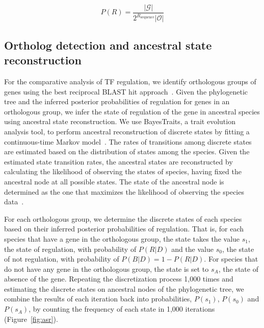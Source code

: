 \begin{equation}
P(R) = \frac{|\mathcal{G}|}{2^{R_{\mathrm{sequence}}} |\mathcal{O}|}
\end{equation}

\subsection{Ortholog detection and ancestral state reconstruction}

For the comparative analysis of TF regulation, we identify orthologous groups
of genes using the best reciprocal BLAST hit
approach~\citep{wall2003detecting}. Given the phylogenetic tree and the inferred
posterior probabilities of regulation for genes in an orthologous group, we
infer the state of regulation of the gene in ancestral species using ancestral
state reconstruction. We use BayesTraits, a trait evolution analysis tool, to
perform ancestral reconstruction of discrete states by fitting a
continuous-time Markov model~\citep{pagel2004bayesian}. The rates of transitions
among discrete states are estimated based on the distribution of states among
the species. Given the estimated state transition rates, the ancestral states
are reconstructed by calculating the likelihood of observing the states of
species, having fixed the ancestral node at all possible states. The state of
the ancestral node is determined as the one that maximizes the likelihood of
observing the species data~\citep{pagel1997inferring, pagel1999maximum}.

For each orthologous group, we determine the discrete states of each species
based on their inferred posterior probabilities of regulation. That is, for
each species that have a gene in the orthologous group, the state takes the
value $s_1$, the state of regulation, with probability of $P(R|D)$ and the
value $s_0$, the state of not regulation, with probability of
$P(B|D)=1-P(R|D)$. For species that do not have any gene in the orthologous
group, the state is set to $s_A$, the state of absence of the gene. Repeating
the discretization process 1,000 times and estimating the discrete states on
ancestral nodes of the phylogenetic tree, we combine the results of each
iteration back into probabilities, $P(s_1)$, $P(s_0)$ and $P(s_A)$, by counting
the frequency of each state in 1,000 iterations (Figure~\ref{fig:asr}).

